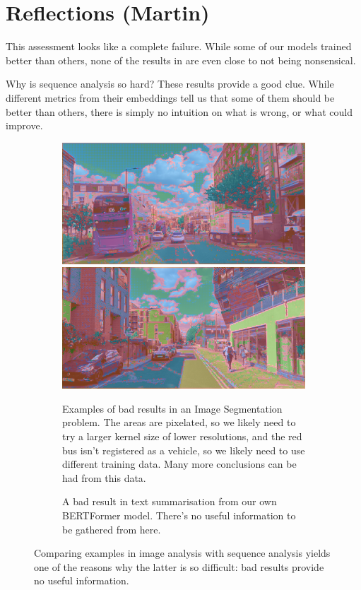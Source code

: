 \section{Reflections (Martin)}
\label{reflections_section}

This assessment looks like a complete failure.
While some of our models trained better than others, none of the results in \appendixA{} are even close to not being nonsensical.

Why is sequence analysis so hard? These results provide a good clue.
While different metrics from their embeddings tell us that some of them should be better than others, there is simply no intuition on what is wrong, or what could improve.

\begin{figure}[h]
	\begin{subfigure}[][265pt][t]{.48\textwidth}
		\includegraphics[width=\textwidth]{bad_convolutional_result.png}
		\includegraphics[width=\textwidth]{bad_convolutional_result_2.png}
		\caption{Examples of bad results in an Image Segmentation problem. The areas are pixelated, so we likely need to try a larger kernel size of lower resolutions, and the red bus isn't registered as a vehicle, so we likely need to use different training data. Many more conclusions can be had from this data.} 
	\end{subfigure}\hfill{}%
	\begin{subfigure}[][265pt][t]{.48\textwidth}
		
		\caption{A bad result in text summarisation from our own BERTFormer model. There's no useful information to be gathered from here.}
	\end{subfigure}
	\caption{Comparing examples in image analysis with sequence analysis yields one of the reasons why the latter is so difficult: bad results provide no useful information.}
\end{figure}

